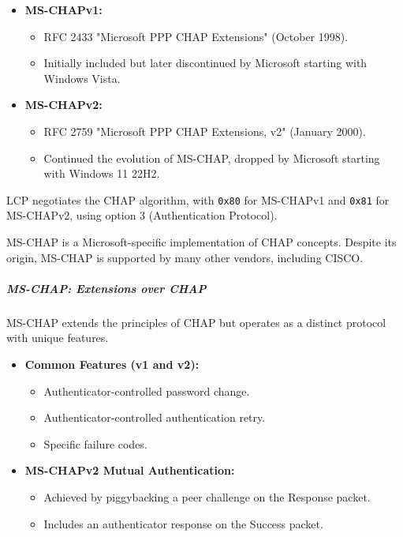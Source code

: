 \begin{itemize}
    \item \textbf{MS-CHAPv1:}
    \begin{itemize}
        \item RFC 2433 "Microsoft PPP CHAP Extensions" (October 1998).
        \item Initially included but later discontinued by Microsoft starting with Windows Vista.
    \end{itemize}
    
    \item \textbf{MS-CHAPv2:}
    \begin{itemize}
        \item RFC 2759 "Microsoft PPP CHAP Extensions, v2" (January 2000).
        \item Continued the evolution of MS-CHAP, dropped by Microsoft starting with Windows 11 22H2.
    \end{itemize}
\end{itemize}

LCP negotiates the CHAP algorithm, with \texttt{0x80} for MS-CHAPv1 and \texttt{0x81} for MS-CHAPv2, using option 3 (Authentication Protocol).

MS-CHAP is a Microsoft-specific implementation of CHAP concepts.
Despite its origin, MS-CHAP is supported by many other vendors, including CISCO.


\subparagraph{MS-CHAP: Extensions over CHAP}
MS-CHAP extends the principles of CHAP but operates as a distinct protocol with unique features.

\begin{itemize}
    \item \textbf{Common Features (v1 and v2):}
    \begin{itemize}
        \item Authenticator-controlled password change.
        \item Authenticator-controlled authentication retry.
        \item Specific failure codes.
    \end{itemize}

    \item \textbf{MS-CHAPv2 Mutual Authentication:}
    \begin{itemize}
        \item Achieved by piggybacking a peer challenge on the Response packet.
        \item Includes an authenticator response on the Success packet.
    \end{itemize}
\end{itemize}

